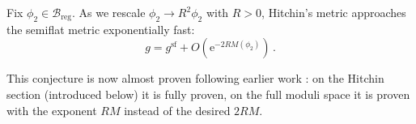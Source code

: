 \documentclass[12pt,letterpaper,reqno]{article}
\numberwithin{equation}{section}
\newcommand{\cB}{\ensuremath{\mathcal B}}
\newcommand{\cM}{\ensuremath{\mathcal M}}
\newcommand{\cO}{\ensuremath{\mathcal O}}
\newcommand{\half}{\ensuremath{\frac{1}{2}}}
\newcommand{\kahler}{K\"ahler\xspace}
\newcommand{\hk}{hyperk\"ahler\xspace}
\newcommand{\I}{{\mathrm i}}
\newcommand{\e}{{\mathrm e}}
\newcommand{\de}{\mathrm{d}}
\newcommand{\reg}{\mathrm{reg}}
\renewcommand{\sf}{\mathrm{sf}}
\DeclareMathOperator{\im}{Im}
\DeclareMathOperator{\Hom}{Hom}
\newcommand{\SU}{\mathrm{SU}}
\newcommand{\U}{\mathrm{U}}
\begin{document}
\begin{conj} \label{conj:weak-metric}
Fix $\phi_2 \in \cB_\reg$.
As we rescale $\phi_2 \to R^2 \phi_2$ with $R > 0$,
Hitchin's metric approaches the semiflat metric
exponentially fast:
\begin{equation}
  g = g^\sf + O(\e^{-2 R M(\phi_2)}) \, .
\end{equation}
\end{conj}






This conjecture is now almost proven
\cite{Mochizuki} following earlier 
work \cite{MSWW,DN,F}: on
the Hitchin section (introduced below)
it is fully proven, on the full moduli space
it is proven with the exponent $RM$ instead
of the desired $2RM$.
\end{document}
